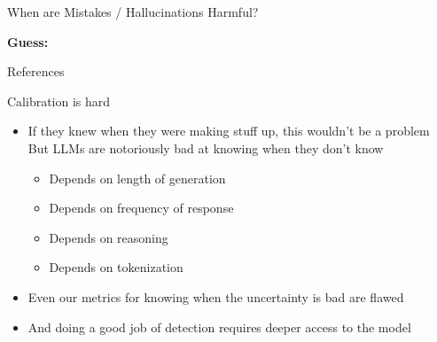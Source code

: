 \documentclass[compress]{beamer}
\begin{document}
\begin{frame}{When are Mistakes / Hallucinations Harmful?}
\begin{center}
\end{center}
{\bf Guess: }   \only<3>{Spherical
  Coordinate} \only<4>{Longitude}  
\end{frame}


\begin{frame}{References}

\tiny

\end{frame}




\begin{frame}{Calibration is hard}
	
	\begin{itemize}
		\item If they knew when they were making stuff up, this wouldn’t be a problem
		But LLMs are notoriously bad at knowing when they don’t know
		\begin{itemize}
			\item Depends on length of generation
			\item Depends on frequency of response
			\item Depends on reasoning
			\item Depends on tokenization 
		\end{itemize}
		\item Even our metrics for knowing when the uncertainty is bad are flawed
		\item And doing a good job of detection requires deeper access to the model
	\end{itemize}
\end{frame}
\end{document}
